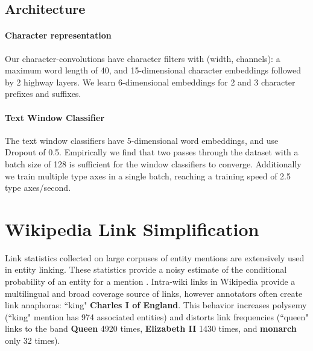 \documentclass[letterpaper]{article}
\begin{document}
\subsection{Architecture}
\paragraph{Character representation} Our character-convolutions have character filters with (width, channels):  a maximum word length of 40, and 15-dimensional character embeddings followed by 2 highway layers. We learn 6-dimensional embeddings for 2 and 3 character prefixes and suffixes.
\paragraph{Text Window Classifier} The text window classifiers have 5-dimensional word embeddings, and use Dropout of 0.5. Empirically we find that two passes through the dataset with a batch size of 128 is sufficient for the window classifiers to converge. Additionally we train multiple type axes in a single batch, reaching a training speed of 2.5 type axes/second.


\section{Wikipedia Link Simplification}
\label{para:anaphora}
Link statistics collected on large corpuses of entity mentions are extensively used in entity linking. These statistics provide a noisy estimate of the conditional probability of an entity  for a mention  . Intra-wiki links in Wikipedia provide a multilingual and broad coverage source of links, however annotators often create link anaphoras: ``king"  \textbf{Charles I of England}. This behavior increases polysemy (``king" mention has 974 associated entities) and distorts link frequencies (``queen" links to the band \textbf{Queen} 4920 times, \textbf{Elizabeth II} 1430 times, and \textbf{monarch} only 32 times).
\end{document}
